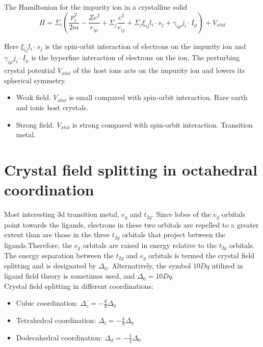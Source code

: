 \documentclass{article}
\begin{document}
		The Hamiltonian for the impurity ion in a crystalline solid
		\begin{equation}
			H = \Sigma_{i}(\frac{p_{i}^{2}}{2m} - \frac{Ze^{2}}{r_{i\mu}} + \Sigma_{j}\frac{e^{2}}{r_{ij}} + \Sigma_{j}\xi_{ij}l_{i}\cdot s_{j} + \gamma_{i\mu}j_{i}\cdot I_{\mu}) + V_{xtal}
		\end{equation}

		Here $\xi_{ij}l_{i}\cdot s_{j}$ is the spin-orbit interaction of electrons on the impurity ion and $\gamma_{i\mu}j_{i}\cdot I_{\mu}$ is the hyperfine interaction of electrons on the ion. The perturbing crystal potential $V_{xtal}$ of the host ions acts on the impurity ion and lowers its spherical symmetry.

		\begin{itemize}
			\item Weak field. $V_{xtal}$ is small compared with spin-orbit interaction. Rare earth and ionic host crystals.
			\item Strong field. $V_{xtal}$ is strong compared with spin-orbit interaction. Transition metal.
		\end{itemize}

	\section{Crystal field splitting in octahedral coordination}
		Most interesting 3d transition metal, $e_{g}$ and $t_{2g}$. Since lobes of the $e_{g}$ orbitals point towards the ligands, electrons in these two orbitals are repelled to a greater extent than are those in the three $t_{2g}$ orbitals that project between the ligands.Therefore, the $e_{g}$ orbitals are raised in energy relative to the $t_{2g}$ orbitals. The energy separation between the $t_{2g}$ and $e_{g}$ orbitals is termed the crystal field splitting and is designated by $\Delta_{0}$. Alternatively, the symbol $10Dq$ utilized in ligand field theory is sometimes used, and $\Delta_{0} = 10Dq$.\\

		Crystal field splitting in different coordinations:\\
		\begin{itemize}
			\item Cubic coordination: $\Delta_{c} = -\frac{8}{9}\Delta_{0}$
			\item Tetrahedral coordination: $\Delta_{t} = -\frac{4}{9}\Delta_{0}$
			\item Dodecahedral coordination: $\Delta_{d} = -\frac{1}{2}\Delta_{0}$
		\end{itemize}
\end{document}
